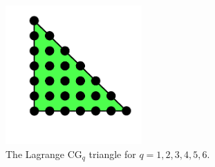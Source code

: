 \begin{figure}
\begin{center}
    \includegraphics[width=5.2cm]{chapters/kirby-6/png/CG6_2d.png}
    \caption{The Lagrange $\mathrm{CG}_{q}$ triangle for $q = 1, 2, 3,
      4, 5, 6$.}
    \label{kirby-6:fig:lagrange:2d}
  \end{center}
\end{figure}

